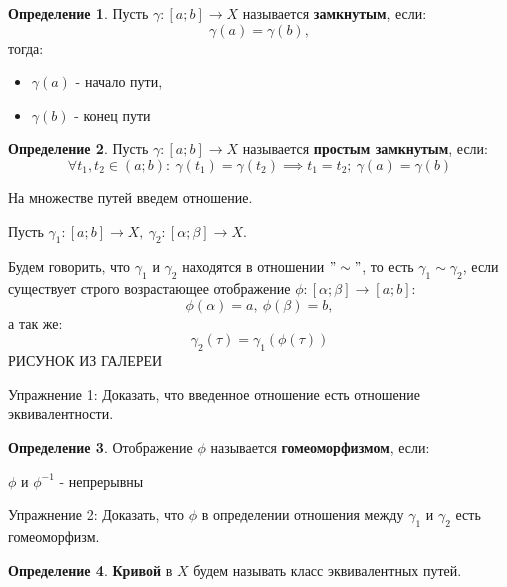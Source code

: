\documentclass{report}
\theoremstyle{definition}
\newtheorem{definition}{Определение}[section]
\begin{document}
\begin{definition}
  Пусть $\gamma:[a;b]\rightarrow X$ называется \textbf{замкнутым}, если:
  \begin{equation*}
    \gamma(a) = \gamma(b),
  \end{equation*}
  тогда:
  \begin{itemize}
    \item $\gamma(a)$ - начало пути,
    \item $\gamma(b)$ - конец пути
  \end{itemize}
\end{definition}

\begin{definition}
  Пусть $\gamma:[a;b]\rightarrow X$ называется \textbf{простым замкнутым}, если:
  \begin{equation*}
    \forall t_1,t_2\in(a;b): \ \gamma(t_1)=\gamma(t_2)\implies t_1=t_2; \ \gamma(a) = \gamma(b)
  \end{equation*}
\end{definition}

\clearpage

На множестве путей введем отношение.

Пусть $\gamma_1:[a;b]\rightarrow X, \ \gamma_2:[\alpha;\beta] \rightarrow X$.

Будем говорить, что $\gamma_1$ и $\gamma_2$ находятся в отношении $"\sim"$, то есть $\gamma_1 \sim \gamma_2$,
если существует строго возрастающее отображение $\phi:[\alpha;\beta]\rightarrow[a;b]:$
\begin{equation*}
  \phi(\alpha) = a, \ \phi(\beta) = b,
\end{equation*}
а так же:
\begin{equation*}
  \gamma_2(\tau) = \gamma_1(\phi(\tau))
\end{equation*}
{\Large РИСУНОК ИЗ ГАЛЕРЕИ}

Упражнение 1: Доказать, что введенное отношение есть отношение эквивалентности.

\begin{definition}
  Отображение $\phi$ называется \textbf{гомеоморфизмом}, если:
  \begin{center}
    $\phi$ и $\phi^{-1}$ - непрерывны
  \end{center}
\end{definition}

Упражнение 2: Доказать, что $\phi$ в определении отношения между $\gamma_1$ и $\gamma_2$ есть
гомеоморфизм.

\begin{definition}
  \textbf{Кривой} в $X$ будем называть класс эквивалентных путей.
\end{definition}
\end{document}
